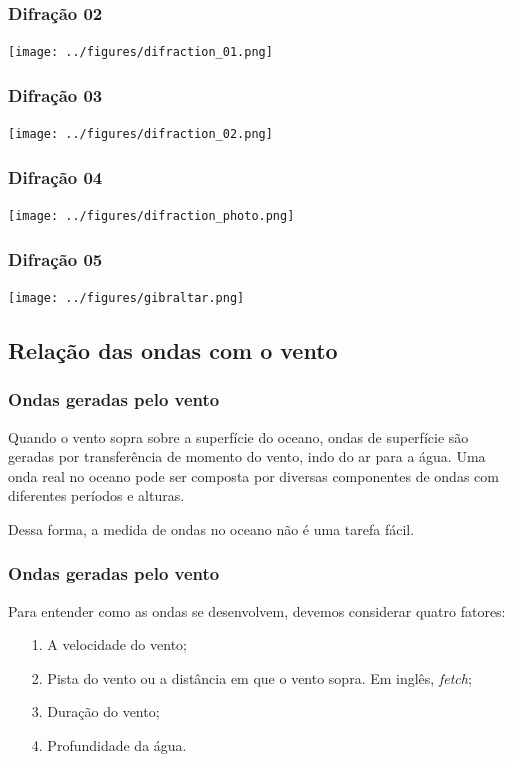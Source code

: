 \begin{frame}
\frametitle{Difração 02}
  \begin{center}
    \texttt{[image: ../figures/difraction\_01.png]}
  \end{center}
\end{frame}


\begin{frame}
\frametitle{Difração 03}
  \begin{center}
    \texttt{[image: ../figures/difraction\_02.png]}
  \end{center}
\end{frame}


\begin{frame}
\frametitle{Difração 04}
\begin{center}
  \texttt{[image: ../figures/difraction\_photo.png]}
\end{center}
\end{frame}


\begin{frame}
\frametitle{Difração 05}
\begin{center}
  \texttt{[image: ../figures/gibraltar.png]}
\end{center}
\end{frame}


\subsection{Relação das ondas com o vento}
\begin{frame}
\frametitle{Ondas geradas pelo vento}
  \begin{block}{}
    Quando o vento sopra sobre a superfície do oceano, ondas de superfície são
    geradas por transferência de momento do vento, indo do ar para a água.
    Uma onda real no oceano pode ser composta por diversas componentes de ondas
    com diferentes períodos e alturas.

    Dessa forma, a medida de ondas no oceano não é uma tarefa fácil.
  \end{block}
\end{frame}

\begin{frame}
\frametitle{Ondas geradas pelo vento}
  Para entender como as ondas se desenvolvem, devemos considerar quatro
  fatores:
  \begin{itemize}[<+-| alert@+>]
    \item[1.] A velocidade do vento;
    \item[2.] Pista do vento ou a distância em que o vento sopra.  Em inglês,
              {\it fetch};
    \item[3.] Duração do vento;
    \item[4.] Profundidade da água.
  \end{itemize}
\end{frame}


